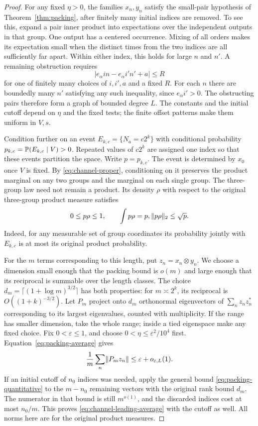 \begin{proof}
For any fixed $\eta>0$, the families $x_n,y_n$ satisfy the small-pair
hypothesis of Theorem~\ref{thm:packing}, after finitely many initial
indices are removed.  To see this, expand a pair inner product into
expectations over the independent outputs in that group.  One output
has a centered occurrence.  Mixing of all orders makes its expectation
small when the distinct times from the two indices are all sufficiently
far apart.  Within either index, this holds for large $n$ and $n'$.
A remaining obstruction requires
\[
              |e_\alpha i n-e_\alpha i'n'+a|\le R
\]
for one of finitely many choices of $i,i',a$ and a fixed $R$.
For each $n$ there are boundedly many $n'$ satisfying any such
inequality, since $e_\alpha i'>0$.  The obstructing pairs therefore
form a graph of bounded degree $L$.  The constants and the initial
cutoff depend on $\eta$ and the fixed tests; the finite offset
patterns make them uniform in $V,s$.

Condition further on an event
$E_{k,c}=\{N_a=c2^k\}$ with conditional probability
$p_{k,c}=\mathbb P(E_{k,c}\mid V)>0$.  Repeated values of $c2^k$ are assigned
one index so that these events partition the space.  Write $p=p_{k,c}$.
The event is determined by $x_0$ once $V$ is fixed.  By
\eqref{eq:channel-proper}, conditioning on it preserves the product
marginal on any two groups and the marginal on each single group.
The three-group law need not remain a product.  Its density $\rho$
with respect to the original three-group product measure satisfies
\begin{equation}\label{eq:channel-density}
              0\le p\rho\le1,\qquad \int p\rho=p,
                         \lVert p\rho\rVert_2\le\sqrt p.
\end{equation}
Indeed, for any measurable set of group coordinates its probability
jointly with $E_{k,c}$ is at most its original product probability.

For the $m$ terms corresponding to this length, put
$z_n=x_n\otimes y_n$.  We choose a dimension small enough that the
packing bound is $o(m)$ and large enough that its reciprocal is
summable over the length classes.  The choice
$d_m=\lceil(1+\log m)^{3/2}\rceil$ has both properties: for
$m\asymp2^k$, its reciprocal is $O((1+k)^{-3/2})$.
Let $P_m$ project onto $d_m$ orthonormal
eigenvectors of $\sum_n z_nz_n^*$ corresponding to its largest
eigenvalues, counted with multiplicity.  If the range has smaller dimension,
take the whole range; inside a tied eigenspace make any fixed choice.
Fix $0<\varepsilon\le1$, and choose
$0<\eta\le\varepsilon^2/10^4$ first.
Equation~\eqref{eq:packing-average} gives
\begin{equation}\label{eq:channel-leading-average}
              \frac1m\sum_n\lVert P_mz_n\rVert
                           \le\varepsilon+o_{\varepsilon,L}(1).
\end{equation}
If an initial cutoff of $n_0$ indices was needed, apply the general
bound \eqref{eq:packing-quantitative} to the $m-n_0$ remaining vectors
with the original rank bound $d_m$.  The numerator in that bound is
still $m^{o(1)}$, and the discarded indices cost at most $n_0/m$.
This proves \eqref{eq:channel-leading-average} with the cutoff as
well.  All norms here are for the original product measures.


\end{proof}
